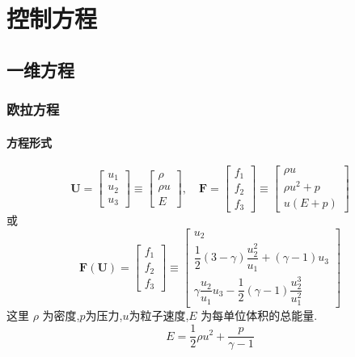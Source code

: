 \documentclass{book}
\begin{document}

\section{控制方程}
\subsection{一维方程}
\subsubsection{欧拉方程}
\paragraph{方程形式}
\begin{equation}
    \mathbf{U}=\left[\begin{array}{l}
            u_{1} \\
            u_{2} \\
            u_{3}
        \end{array}\right] \equiv\left[\begin{array}{c}
            \rho   \\
            \rho u \\
            E
        \end{array}\right], \quad \mathbf{F}=\left[\begin{array}{c}
            f_{1} \\
            f_{2} \\
            f_{3}
        \end{array}\right] \equiv\left[\begin{array}{c}
            \rho u       \\
            \rho u^{2}+p \\
            u(E+p)
        \end{array}\right]
\end{equation}
或
\begin{equation}
    \mathbf{F}(\mathbf{U})=\left[\begin{array}{l}
            f_{1} \\
            f_{2} \\
            f_{3}
        \end{array}\right] \equiv\left[\begin{array}{c}
            u_{2}                                                            \\
            \dfrac{1}{2}(3-\gamma) \dfrac{u_{2}^{2}}{u_{1}}+(\gamma-1) u_{3} \\
            \gamma \dfrac{u_{2}}{u_{1}} u_{3}-\dfrac{1}{2}(\gamma-1) \dfrac{u_{2}^{3}}{u_{1}^{2}}
        \end{array}\right]
\end{equation}
这里 $\rho$ 为密度,$p$为压力,$u$为粒子速度,$E$ 为每单位体积的总能量.
\begin{equation}
    E=\dfrac{1}{2}\rho u^{2}+\frac{p}{\gamma-1}
\end{equation}
\end{document}
